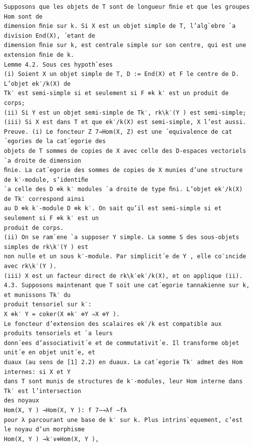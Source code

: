 \documentclass[10pt]{article}
\begin{document}
\begin{verbatim}
Supposons que les objets de T sont de longueur ﬁnie et que les groupes Hom sont de
dimension ﬁnie sur k. Si X est un objet simple de T, l’alg`ebre `a division End(X), ´etant de
dimension ﬁnie sur k, est centrale simple sur son centre, qui est une extension ﬁnie de k.
Lemme 4.2. Sous ces hypoth`eses
(i) Soient X un objet simple de T, D := End(X) et F le centre de D. L’objet ek′/k(X) de
Tk′ est semi-simple si et seulement si F ⊗k k′ est un produit de corps;
(ii) Si Y est un objet semi-simple de Tk′, rk\k′(Y ) est semi-simple;
(iii) Si X est dans T et que ek′/k(X) est semi-simple, X l’est aussi.
Preuve. (i) Le foncteur Z 7→Hom(X, Z) est une ´equivalence de cat´egories de la cat´egorie des
objets de T sommes de copies de X avec celle des D-espaces vectoriels `a droite de dimension
ﬁnie. La cat´egorie des sommes de copies de X munies d’une structure de k′-module, s’identiﬁe
`a celle des D ⊗k k′ modules `a droite de type ﬁni. L’objet ek′/k(X) de Tk′ correspond ainsi
au D ⊗k k′-module D ⊗k k′. On sait qu’il est semi-simple si et seulement si F ⊗k k′ est un
produit de corps.
(ii) On se ram`ene `a supposer Y simple. La somme S des sous-objets simples de rk\k′(Y ) est
non nulle et un sous k′-module. Par simplicit´e de Y , elle co¨ıncide avec rk\k′(Y ).
(iii) X est un facteur direct de rk\k′ek′/k(X), et on applique (ii).
4.3. Supposons maintenant que T soit une cat´egorie tannakienne sur k, et munissons Tk′ du
produit tensoriel sur k′:
X ⊗k′ Y = coker(X ⊗k′ ⊗Y ⇒X ⊗Y ).
Le foncteur d’extension des scalaires ek′/k est compatible aux produits tensoriels et `a leurs
donn´ees d’associativit´e et de commutativit´e. Il transforme objet unit´e en objet unit´e, et
duaux (au sens de [1] 2.2) en duaux. La cat´egorie Tk′ admet des Hom internes: si X et Y
dans T sont munis de structures de k′-modules, leur Hom interne dans Tk′ est l’intersection
des noyaux
Hom(X, Y ) →Hom(X, Y ): f 7−→λf −fλ
pour λ parcourant une base de k′ sur k. Plus intrins`equement, c’est le noyau d’un morphisme
Hom(X, Y ) →k′∨⊗Hom(X, Y ),


\end{verbatim}
\end{document}

